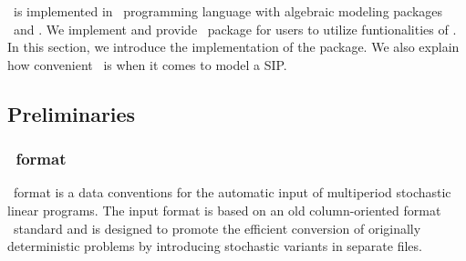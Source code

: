 \siplibtwo\ is implemented in \julia\ programming language with algebraic modeling packages \jump\ and \structjump. We implement and provide \julia\ package for users to utilize funtionalities of \siplibtwo. In this section, we introduce the implementation of the package. We also explain how convenient \structjump\ is when it comes to model a SIP.

\subsection{Preliminaries}
\subsubsection{\smps\ format} \label{subsec:smps}
\smps\ format \cite{SMPS} is a data conventions for the automatic input of multiperiod stochastic linear programs. The input format is based on an old column-oriented format \mpsx\ standard and is designed to promote the efficient conversion of originally deterministic problems by introducing stochastic variants in separate files. 

